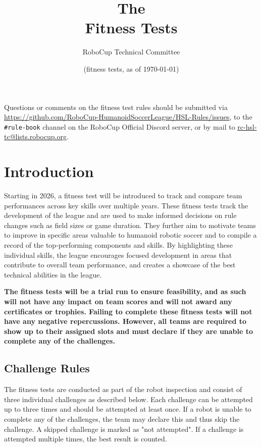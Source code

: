 \documentclass[12pt]{article}
\title{The \leaguename\\ Fitness Tests}
\author{RoboCup Technical Committee}
\date{(\RCYear fitness tests, as of \today)}
\begin{document}
\maketitle

\begin{center}
Questions or comments on the fitness test rules should be submitted via \url{https://github.com/RoboCup-HumanoidSoccerLeague/HSL-Rules/issues}, to the \texttt{\#rule-book} channel on the RoboCup Official Discord server, or by mail to \url{rc-hsl-tc@lists.robocup.org}.
\end{center}

\newpage

\tableofcontents
\setcounter{tocdepth}{3}

\thispagestyle{fancy}

\clearpage

\cfoot{\thepage}
\setcounter{page}{1}

\section{Introduction}
Starting in 2026, a fitness test will be introduced to track and compare team performances across key skills over multiple years. 
These fitness tests track the development of the league and are used to make informed decisions on rule changes such as field sizes or game duration.
They further aim to motivate teams to improve in specific areas valuable to humanoid robotic soccer and to compile a record of the top-performing components and skills. 
By highlighting these individual skills, the league encourages focused development in areas that contribute to overall team performance, and creates a showcase of the best technical abilities in the league.

\textbf{The \RCYear fitness tests will be a trial run to ensure feasibility, and as such will not have any impact on team scores and will not award any certificates or trophies. Failing to complete these fitness tests will not have any negative repercussions. However, all teams are required to show up to their assigned slots and must declare if they are unable to complete any of the challenges.}

\subsection{Challenge Rules}

The fitness tests are conducted as part of the robot inspection and consist of three individual challenges as described below. Each challenge can be attempted up to three times and should be attempted at least once. If a robot is unable to complete any of the challenges, the team may declare this and thus skip the challenge. A skipped challenge is marked as "not attempted". If a challenge is attempted multiple times, the best result is counted.
\end{document}
